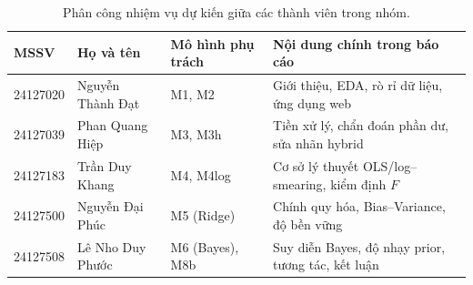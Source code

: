 \begin{table}[htbp]
  \centering
  \caption{Phân công nhiệm vụ dự kiến giữa các thành viên trong nhóm.}
  \label{tab:assign}
  \small
  \begin{tabular}{@{}l l l >{\raggedright\arraybackslash}p{5.8cm}@{}}
    \toprule
    MSSV & Họ và tên & Mô hình phụ trách & Nội dung chính trong báo cáo \\
    \midrule
    24127020 & Nguyễn Thành Đạt & M1, M2 & Giới thiệu, EDA, rò rỉ dữ liệu, ứng dụng web \\
    24127039 & Phan Quang Hiệp & M3, M3h & Tiền xử lý, chẩn đoán phần dư, sửa nhãn hybrid \\
    24127183 & Trần Duy Khang & M4, M4log & Cơ sở lý thuyết OLS/log--smearing, kiểm định $F$ \\
    24127500 & Nguyễn Đại Phúc & M5 (Ridge) & Chính quy hóa, Bias--Variance, độ bền vững \\
    24127508 & Lê Nho Duy Phước & M6 (Bayes), M8b & Suy diễn Bayes, độ nhạy prior, tương tác, kết luận \\
    \bottomrule
  \end{tabular}
\end{table}
